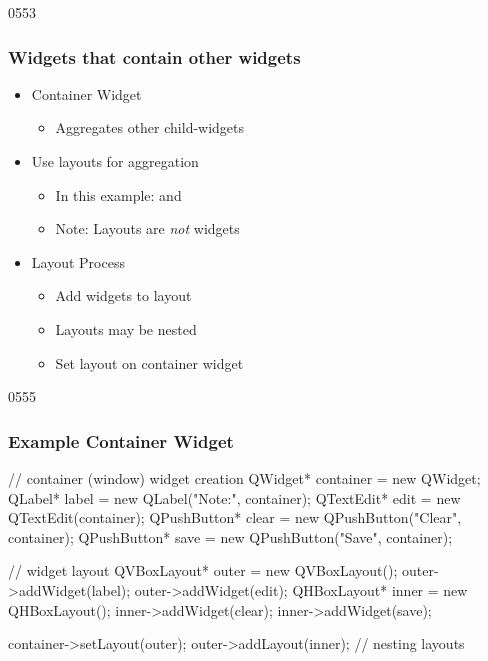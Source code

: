\begin{slide}{0553}\frametitle{Widgets that contain other widgets}
  
  \begin{itemize}
  \item Container Widget
    \begin{itemize}
    \item Aggregates other child-widgets
    \end{itemize}\medskip

  \item Use layouts for aggregation
    \begin{itemize}
    \item In this example:  and \\ 
    \item Note: Layouts are \emph{not} widgets
    \end{itemize}\medskip

  \item Layout Process
    \begin{itemize}
    \item Add widgets to layout
    \item Layouts may be nested
    \item Set layout on container widget
    \end{itemize}
  \end{itemize}
\end{slide}

\begin{slide}[fragile]{0555}\frametitle{Example Container Widget}
  \begin{cpp}
// container (window) widget creation
QWidget* container = new QWidget;
QLabel* label = new QLabel("Note:", container);
QTextEdit* edit = new QTextEdit(container);
QPushButton* clear = new QPushButton("Clear", container);
QPushButton* save = new QPushButton("Save", container);

// widget layout
QVBoxLayout* outer = new QVBoxLayout();
outer->addWidget(label);
outer->addWidget(edit);
QHBoxLayout* inner = new QHBoxLayout();
inner->addWidget(clear);
inner->addWidget(save);

container->setLayout(outer);
outer->addLayout(inner); // nesting layouts
    \end{cpp}
\end{slide}
